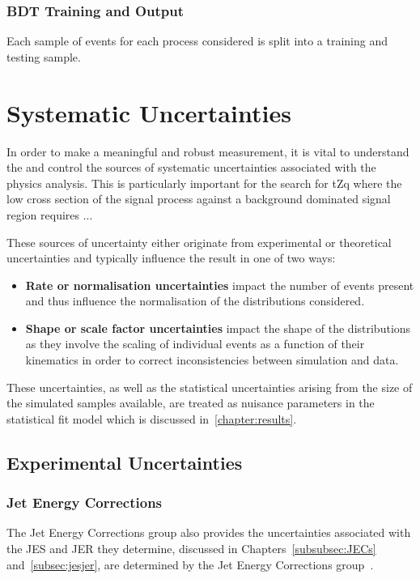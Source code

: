 
\subsection{BDT Training and Output}
Each sample of events for each process considered is split into a training and testing sample.
\chapter{Systematic Uncertainties}\label{chapter:systematics}
In order to make a meaningful and robust measurement, it is vital to understand the and control the sources of systematic uncertainties associated with the physics analysis.
This is particularly important for the search for tZq where the low cross section of the signal process against a background dominated signal region requires ... 

These sources of uncertainty either originate from experimental or theoretical uncertainties and typically influence the result in one of two ways:
\begin{itemize}
\item \textbf{Rate or normalisation uncertainties} impact the number of events present and thus influence the  normalisation of the distributions considered.
\item \textbf{Shape or scale factor uncertainties} impact the shape of the distributions as they involve the scaling of individual events as a function of their kinematics in order to correct inconsistencies between simulation and data.
\end{itemize}

These uncertainties, as well as the statistical uncertainties arising from the size of the simulated samples available, are treated as nuisance parameters in the statistical fit model which is discussed in~\ref{chapter:results}.

\section{Experimental Uncertainties}
\subsection{Jet Energy Corrections}
The Jet Energy Corrections group also provides the uncertainties associated with the JES and JER they determine, discussed in Chapters~\ref{subsubsec:JECs} and~\ref{subsec:jesjer}, are determined by the Jet Energy Corrections group~\cite{Khachatryan:2016kdb}. 

